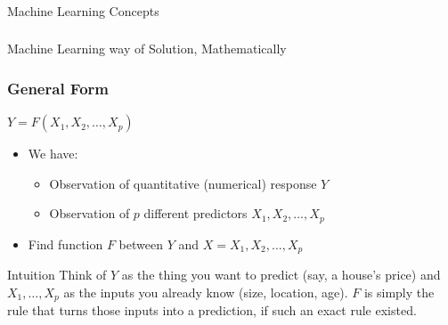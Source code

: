 \begin{frame}[fragile]\frametitle{}
\begin{center}
{\Large Machine Learning Concepts}
\end{center}
\end{frame}

\begin{frame}[fragile]\frametitle{}
\begin{center}
{\Large Machine Learning way of Solution, Mathematically}
\end{center}
\end{frame}


\begin{frame}[fragile]\frametitle{General Form}
$Y= F(X_1, X_2,\ldots, X_p)$
\begin{itemize}
\item We have:
	\begin{itemize}
	\item Observation of quantitative (numerical) response $Y$
	\item Observation of $p$ different predictors ${X_1, X_2, \ldots, X_p}$
	\end{itemize}
	\item Find function $F$ between $Y$ and $X = {X_1, X_2,\ldots, X_p}$
\end{itemize}
\begin{block}{Intuition}
Think of $Y$ as the thing you want to predict (say, a house's price) and $X_1,\ldots,X_p$ as the inputs you already know (size, location, age). $F$ is simply the rule that turns those inputs into a prediction, if such an exact rule existed.
\end{block}
\end{frame}

